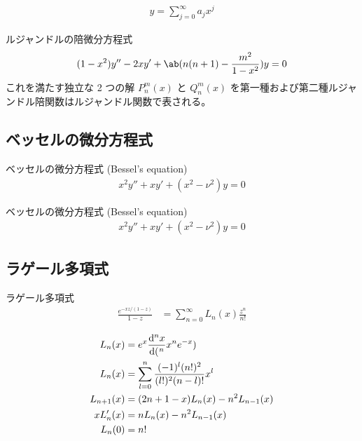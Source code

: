 \documentclass[uplatex,diffipdfmx,a4paper,11pt]{jlreq}
\begin{document}
\begin{align}
  y = \sum_{j=0}^{\infty}a_jx^j
\end{align}

\begin{definition}[ルジャンドルの陪微分方程式]
  ルジャンドルの陪微分方程式
  \begin{align}
    (1 - x^2)y'' - 2xy' + \ab(n(n + 1) - \frac{m^2}{1 - x^2})y = 0
  \end{align}
  これを満たす独立な 2 つの解 $P_n^m(x)$ と $Q_n^m(x)$ を第一種および第二種ルジャンドル陪関数はルジャンドル関数で表される。
\end{definition}

\subsection{ベッセルの微分方程式}
\begin{definition}
  ベッセルの微分方程式 (Bessel's equation)
  \begin{align}
    x^2y'' + xy' + (x^2 - \nu^2)y = 0
  \end{align}
\end{definition}
\begin{definition}
  ベッセルの微分方程式 (Bessel's equation)
  \begin{align}
    x^2y'' + xy' + (x^2 - \nu^2)y = 0
  \end{align}
\end{definition}

\subsection{ラゲール多項式}
\begin{definition}
  ラゲール多項式
  \begin{align}
    \frac{e^{-xz/(1-z)}}{1-z} & = \sum_{n=0}^{\infty}L_n(x)\frac{z^n}{n!}
  \end{align}
\end{definition}
\begin{proposition}
  \begin{align}
    L_n(x)     & = e^x\diff[n]{x}(x^ne^{-x})                          \\
    L_n(x)     & = \sum_{l=0}^{n}\frac{(-1)^l(n!)^2}{(l!)^2(n-l)!}x^l \\
    L_{n+1}(x) & = (2n + 1 - x)L_n(x) - n^2L_{n-1}(x)                 \\
    xL_n'(x)   & = nL_n(x) - n^2L_{n-1}(x)                            \\
    L_n(0)     & = n!
  \end{align}
\end{proposition}
\end{document}

